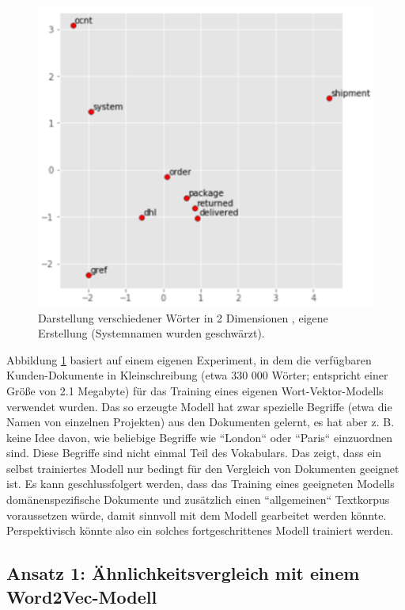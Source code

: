 \begin{figure}[]
\centering
\includegraphics[scale=0.9]{content/pics/Picture_11.png}
\caption{Darstellung verschiedener Wörter in 2 Dimensionen , eigene Erstellung (Systemnamen wurden geschwärzt).}
\label{Abbildung:wordvecintuition}
\end{figure}

Abbildung \ref{Abbildung:wordvecintuition} basiert auf einem eigenen Experiment, in dem die verfügbaren Kunden-Dokumente in Kleinschreibung (etwa 330 000 Wörter; entspricht einer Größe von 2.1 Megabyte) für das Training eines eigenen Wort-Vektor-Modells verwendet wurden. Das so erzeugte Modell hat zwar spezielle Begriffe (etwa die Namen von einzelnen Projekten) aus den Dokumenten gelernt, es hat aber z. B. keine Idee davon, wie beliebige Begriffe wie ``London`` oder ``Paris`` einzuordnen sind. Diese Begriffe sind nicht einmal Teil des Vokabulars. Das zeigt, dass ein selbst trainiertes Modell nur bedingt für den Vergleich von Dokumenten geeignet ist. Es kann geschlussfolgert werden, dass das Training eines geeigneten Modells domänenspezifische Dokumente und zusätzlich einen ``allgemeinen`` Textkorpus voraussetzen würde, damit sinnvoll mit dem Modell gearbeitet werden könnte. Perspektivisch könnte also ein solches fortgeschrittenes Modell trainiert werden. 

\subsection{Ansatz 1: Ähnlichkeitsvergleich mit einem Word2Vec-Modell}

